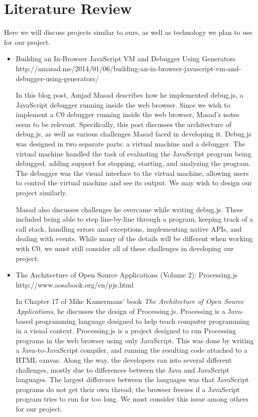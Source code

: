 \documentclass[11pt]{article}
\begin{document}
\section{Literature Review}
\par
Here we will discuss projects similar to ours, as well as technology
we plan to use for our project.
\begin{itemize}
\item Building an In-Browser JavaScript VM and Debugger Using Generators\\
  http://amasad.me/2014/01/06/building-an-in-browser-javascript-vm-and-debugger-using-generators/
  \par
  In this blog post, Amjad Masad describes how he implemented
  debug.js, a JavaScript debugger running inside the web
  browser. Since we wish to implement a C0 debugger running inside the
  web browser, Masad's notes seem to be relevant.  Specifically, this
  post discusses the architecture of debug.js, as well as various
  challenges Masad faced in developing it.  Debug.js was designed in
  two separate parts: a virtual machine and a debugger. The virtual
  machine handled the task of evaluating the JavaScript program being
  debugged, adding support for stopping, starting, and analyzing the
  program. The debugger was the visual interface to the virtual
  machine, allowing users to control the virtual machine and see its
  output. We may wish to design our project similarly.
  \par
  Masad also discusses challenges he overcame while writing
  debug.js. These included being able to step line-by-line through a
  program, keeping track of a call stack, handling errors and
  exceptions, implementing native APIs, and dealing with events. While
  many of the details will be different when working with C0, we must
  still consider all of these challenges in developing our project.

\item The Architecture of Open Source Applications (Volume 2): Processing.js\\
  http://www.aosabook.org/en/pjs.html
  \par
  In Chapter 17 of Mike Kamermans' book {\it The Architecture of Open
  Source Applications}, he discusses the design of
  Processing.js. Processing is a Java-based programming language
  designed to help teach computer programming in a visual
  context. Processing.js is a project designed to run Processing
  programs in the web browser using only JavaScript.  This was done by
  writing a Java-to-JavaScript compiler, and running the resulting
  code attached to a HTML canvas.  Along the way, the developers ran
  into several different challenges, mostly due to differences between
  the Java and JavaScript languages.  The largest difference between
  the languages was that JavaScript programs do not get their own
  thread; the browser freezes if a JavaScript program tries to run for
  too long.  We must consider this issue among others for our project.


\end{itemize}
\end{document}
